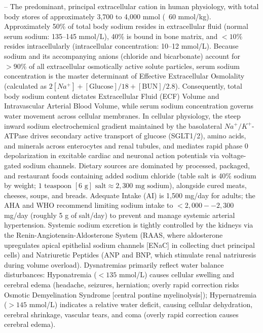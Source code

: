 -- The predominant, principal extracellular cation in human physiology, with total body stores of approximately 3,700 to 4,000 mmol (~60 mmol/kg). Approximately 50\% of total body sodium resides in extracellular fluid (normal serum sodium: 135--145 mmol/L), 40\% is bound in bone matrix, and $<10\%$ resides intracellularly (intracellular concentration: 10--12 mmol/L). Because sodium and its accompanying anions (chloride and bicarbonate) account for $>90\%$ of all extracellular osmotically active solute particles, serum sodium concentration is the master determinant of Effective Extracellular Osmolality (calculated as $2[Na^+] + [\text{Glucose}]/18 + [\text{BUN}]/2.8$). Consequently, total body sodium content dictates Extracellular Fluid (ECF) Volume and Intravascular Arterial Blood Volume, while serum sodium concentration governs water movement across cellular membranes. In cellular physiology, the steep inward sodium electrochemical gradient maintained by the basolateral $Na^+/K^+$-ATPase drives secondary active transport of glucose (SGLT1/2), amino acids, and minerals across enterocytes and renal tubules, and mediates rapid phase 0 depolarization in excitable cardiac and neuronal action potentials via voltage-gated sodium channels. Dietary sources are dominated by processed, packaged, and restaurant foods containing added sodium chloride (table salt is 40\% sodium by weight; $1\text{ teaspoon } [6\text{ g}]\text{ salt} \approx 2,300\text{ mg sodium}$), alongside cured meats, cheeses, soups, and breads. Adequate Intake (AI) is 1,500 mg/day for adults; the AHA and WHO recommend limiting sodium intake to $<2,000--2,300$ mg/day (roughly 5 g of salt/day) to prevent and manage systemic arterial hypertension. Systemic sodium excretion is tightly controlled by the kidneys via the Renin-Angiotensin-Aldosterone System (RAAS, where aldosterone upregulates apical epithelial sodium channels [ENaC] in collecting duct principal cells) and Natriuretic Peptides (ANP and BNP, which stimulate renal natriuresis during volume overload). Dysnatremias primarily reflect water balance disturbances: Hyponatremia ($<135$ mmol/L) causes cellular swelling and cerebral edema (headache, seizures, herniation; overly rapid correction risks Osmotic Demyelination Syndrome [central pontine myelinolysis]); Hypernatremia ($>145$ mmol/L) indicates a relative water deficit, causing cellular dehydration, cerebral shrinkage, vascular tears, and coma (overly rapid correction causes cerebral edema).

